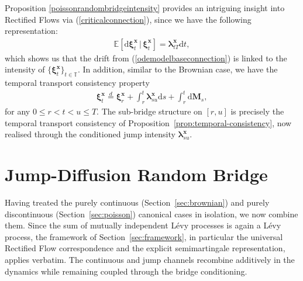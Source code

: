 \documentclass{article}
\newcommand{\levy}{{L\'evy }}
\def\E{\mathbb{E}}
\def\T{\mathbb{T}}
\def\dd{\mathrm{d}}
\def\xib{\boldsymbol{\xi}}
\theoremstyle{definition}
\begin{document}
Proposition \ref{poissonrandombridgeintensity} provides an intriguing insight into Rectified Flows via (\ref{criticalconnection}), since we have the following representation:
\begin{align}
\E\left[\dd \xib^{\boldsymbol{x}}_{t} \,|\, \xib^{\boldsymbol{x}}_{t} \right] = \boldsymbol{\lambda}^{\boldsymbol{x}}_{tT}\dd t, \label{criticalconnectionintensity}
\end{align}
which shows us that the drift from (\ref{odemodelbaseconnection}) is linked to the intensity of $\{\xib^{\boldsymbol{x}}_t\}_{t\in\T}$. In addition, similar to the Brownian case, we have the temporal transport consistency property
\begin{align}
\xib^{\boldsymbol{x}}_t \overset{d}{=} \xib^{\boldsymbol{x}}_r + \int_r^t \boldsymbol{\lambda}^{\boldsymbol{x}}_{su}\dd s + \int_r^t \dd \mathbf{M}_s, \label{twowayconstructpoisson}
\end{align}
for any $0\leq r < t < u \leq T$. The sub-bridge structure on $[r,u]$ is precisely the temporal transport consistency of Proposition~\ref{prop:temporal-consistency}, now realised through the conditioned jump intensity $\boldsymbol{\lambda}^{\boldsymbol{x}}_{su}$.

\section{Jump-Diffusion Random Bridge}\label{sec:jumpdiff}

Having treated the purely continuous (Section~\ref{sec:brownian}) and purely discontinuous
(Section~\ref{sec:poisson}) canonical cases in isolation, we now combine them. Since the sum of
mutually independent \levy processes is again a \levy process, the framework of
Section~\ref{sec:framework}, in particular the universal Rectified Flow correspondence and the
explicit semimartingale representation, applies verbatim. The continuous and jump channels recombine
additively in the dynamics while remaining coupled through the bridge conditioning.
\end{document}
